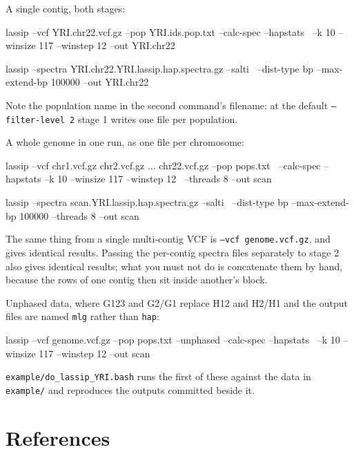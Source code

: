 \documentclass[11pt]{article}
\newcommand{\opt}[1]{\texttt{#1}}
\begin{document}
A single contig, both stages:

\begin{shell}
lassip --vcf YRI.chr22.vcf.gz --pop YRI.ids.pop.txt --calc-spec --hapstats \
       --k 10 --winsize 117 --winstep 12 --out YRI.chr22

lassip --spectra YRI.chr22.YRI.lassip.hap.spectra.gz --salti \
       --dist-type bp --max-extend-bp 100000 --out YRI.chr22
\end{shell}

Note the population name in the second command's filename: at the default
\opt{--filter-level 2} stage 1 writes one file per population.

A whole genome in one run, as one file per chromosome:

\begin{shell}
lassip --vcf chr1.vcf.gz chr2.vcf.gz ... chr22.vcf.gz --pop pops.txt \
       --calc-spec --hapstats --k 10 --winsize 117 --winstep 12 \
       --threads 8 --out scan

lassip --spectra scan.YRI.lassip.hap.spectra.gz --salti \
       --dist-type bp --max-extend-bp 100000 --threads 8 --out scan
\end{shell}

The same thing from a single multi-contig VCF is \opt{--vcf genome.vcf.gz}, and
gives identical results. Passing the per-contig spectra files separately to
stage 2 also gives identical results; what you must not do is concatenate them
by hand, because the rows of one contig then sit inside another's block.

Unphased data, where G123 and G2/G1 replace H12 and H2/H1 and the output files
are named \texttt{mlg} rather than \texttt{hap}:

\begin{shell}
lassip --vcf genome.vcf.gz --pop pops.txt --unphased --calc-spec --hapstats \
       --k 10 --winsize 117 --winstep 12 --out scan
\end{shell}

\texttt{example/do\_lassip\_YRI.bash} runs the first of these against the data
in \texttt{example/} and reproduces the outputs committed beside it.

\section{References}
\end{document}
